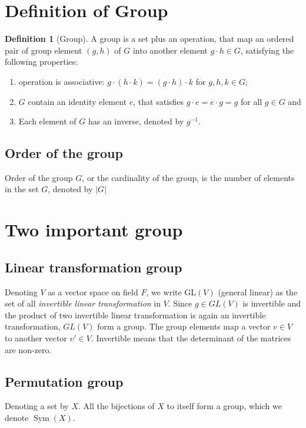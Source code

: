 \documentclass{amsart}
\theoremstyle{remark}
\theoremstyle{remark}
\theoremstyle{definition}
\newtheorem*{definition}{Definition}
\DeclareMathOperator{\Sym}{Sym}
\begin{document}
\section*{Definition of Group}
\begin{definition}[Group]
    A group is a set plus an operation, that map an ordered pair of group element $(g,h)$ of $G$ into another element $g\cdot h \in G$, satisfying
    the following properties:
    \begin{enumerate}
        \item operation is associative: $g\cdot (h \cdot k) = (g\cdot h) \cdot k$ for $g,h,k \in G$;
        \item $G$ contain an identity element $e$, that satisfies $g\cdot e = e\cdot g = g$ for all $g \in G$ and 
        \item Each element of $G$ has an inverse, denoted by $g^{-1}$.
    \end{enumerate}  
\end{definition}

\subsection*{Order of the group}
    Order of the group $G$, or the cardinality of the group, is the number of elements in the set $G$, denoted by $|G|$


\vspace{10pt}
\section*{Two important group}

\subsection*{Linear transformation group}
Denoting $V$ as a vector space on field $F$, we write $\text{GL}(V)$ (general linear) as the set of all \emph{invertible linear transformation} in $V$. 
Since $g\in GL(V)$ is invertible and the product of two invertible linear transformation is again an invertible transformation, $GL(V)$ 
form a group. The group elements map a vector $v\in V$ to another vector $v' \in V$. Invertible means that the determinant of the 
matrices are non-zero.

\subsection*{Permutation group}
Denoting a set by $X$. All the bijections of $X$ to itself form a group, which we denote $\Sym(X)$. 
\end{document}
